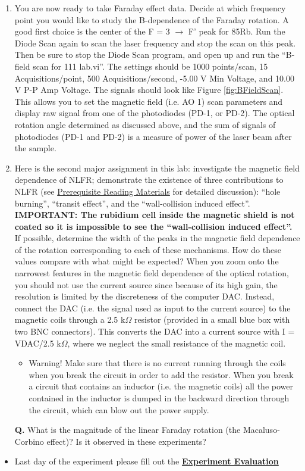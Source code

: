 \documentclass{../lab}
\begin{document}
\begin{enumerate}
    \item You are now ready to take Faraday effect data. Decide at which frequency point you would like to study the B-dependence of the Faraday rotation. A good first choice is the center of the F = 3 $\rightarrow$ F' peak for 85Rb. Run the Diode Scan again to scan the laser frequency and stop the scan on this peak. Then be sure to stop the Diode Scan program, and open up and run the ``B-field scan for 111 lab.vi''. The settings should be 1000 points/scan, 15 Acquisitions/point, 500 Acquisitions/second, -5.00 V Min Voltage, and 10.00 V P-P Amp Voltage. The signals should look like Figure \ref{fig:BFieldScan}. This allows you to set the magnetic field (i.e. AO 1) scan parameters and display raw signal from one of the photodiodes (PD-1, or PD-2). The optical rotation angle determined as discussed above, and the sum of signals of photodiodes (PD-1 and PD-2) is a measure of power of the laser beam after the sample.
    
    \item Here is the second major assignment in this lab: investigate the magnetic field dependence of NLFR; demonstrate the existence of three contributions to NLFR (see \hyperref[sec:BeforeFirstDay]{Prerequisite Reading Materials} for detailed discussion): ``hole burning'', ``transit effect'', and the ``wall-collision induced effect''. \textbf{IMPORTANT: The rubidium cell inside the magnetic shield is not coated so it is impossible to see the ``wall-collision induced effect''.} If possible, determine the width of the peaks in the magnetic field dependence of the rotation corresponding to each of these mechanisms. How do these values compare with what might be expected? When you zoom onto the narrowest features in the magnetic field dependence of the optical rotation, you should not use the current source since because of its high gain, the resolution is limited by the discreteness of the computer DAC. Instead, connect the DAC (i.e. the signal used as input to the current source) to the magnetic coils through a 2.5 k$\Omega$ resistor (provided in a small blue box with two BNC connectors). This converts the DAC into a current source with I = VDAC/2.5 k$\Omega$, where we neglect the small resistance of the magnetic coil.
    
    \begin{itemize}
        \item Warning! Make sure that there is no current running through the coils when you break the circuit in order to add the resistor. When you break a circuit that contains an inductor (i.e. the magnetic coils) all the power contained in the inductor is dumped in the backward direction through the circuit, which can blow out the power supply.
    
    \end{itemize}
    
    \textbf{Q.} What is the magnitude of the linear Faraday rotation (the Macaluso-Corbino effect)? Is it observed in these experiments?

\end{enumerate}

\begin{itemize}
    \item Last day of the experiment please fill out the \href{\ExperimentEvaluation}{\textbf{Experiment Evaluation}}

\end{itemize}
\end{document}
